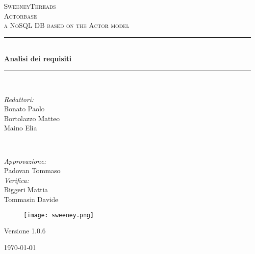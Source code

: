 \documentclass[a4paper]{report}
\begin{document}
	
	\begin{titlepage}
		\newcommand{\HRule}{\rule{\linewidth}{0.5mm}} 
		\center  
		
		\textsc{\LARGE SweeneyThreads}\\[1.5cm] 
		\textsc{\Large Actorbase}\\[0.5cm] 
		\textsc{\large a NoSQL DB based on the Actor model}\\[0.5cm]
		
		
		\HRule \\[0.4cm]
		{ \huge \bfseries Analisi dei requisiti}\\[0.4cm] 
		\HRule \\[1.5cm]
		
		\begin{minipage}{0.4\textwidth}
			\begin{flushleft} \large
				\emph{Redattori:}\\
				Bonato Paolo \\
				Bortolazzo Matteo \\
				Maino Elia
			\end{flushleft}
		\end{minipage}
		~
		\begin{minipage}{0.4\textwidth}
			\begin{flushright} \large
				\emph{Approvazione:} \\
				Padovan Tommaso \\
				\emph{Verifica:} \\
				Biggeri Mattia \\
				Tommasin Davide 
			\end{flushright}
		\end{minipage}
		
		\begin{figure}[H]
			\centering
			\texttt{[image: sweeney.png]}
		\end{figure}
		\begin{center}
			Versione 1.0.6
		\end{center}
		{\large \today}\\[3cm] 
		\vfill  
	\end{titlepage}
	
	
	\tableofcontents
	
\end{document}
